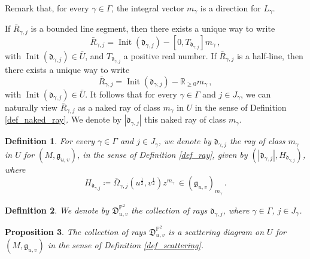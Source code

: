 \documentclass[12pt, a4paper]{amsart}
\newtheorem{defn}{Definition}[section]
\newtheorem{prop}[defn]{Proposition}
\newcommand\PP{\mathbb P}
\newcommand\R{\mathbb R}
\newcommand\fd{\mathfrak d}
\newcommand\fD{\mathfrak D}
\newcommand\fg{\mathfrak g}
\newcommand\Init{\operatorname{Init}}
\begin{document}
Remark that, for every $\gamma \in \Gamma$, 
the integral vector $m_\gamma$ is a direction for $L_\gamma$.

If $\bar{R}_{\gamma,j}$ is a bounded line segment, then there
exists a unique way to write 
\[\bar{R}_{\gamma,j}=\Init(\fd_{\gamma,j}) - [0,T_{\fd_{\gamma,j}}] m_\gamma \,,\]
with
$\Init(\fd_{\gamma,j}) \in \bar{U}$, and
$T_{\fd_{\gamma,j}}$ a positive real number.
If $\bar{R}_{\gamma,j}$ is a half-line, then there exists a unique way to write
\[\bar{R}_{\gamma,j}=\Init(\fd_{\gamma,j}) - \R_{\geqslant 0} m_\gamma \,,\]
with  $\Init(\fd_{\gamma,j}) \in \bar{U}$.
It follows that for every $\gamma \in \Gamma$ and $j \in J_\gamma$, we can naturally view 
$\bar{R}_{\gamma,j}$ as a naked ray of class $m_\gamma$ in $U$ in the sense of Definition 
\ref{def_naked_ray}. We denote by $|\fd_{\gamma,j}|$ this naked ray of class $m_\gamma$.


\begin{defn} \label{def_ray_stability_scattering}
For every $\gamma \in \Gamma$
and $j \in J_\gamma$, we denote by $\fd_{\gamma,j}$ the ray of class 
$m_\gamma$ in $U$ for 
$(M, \fg_{u,v})$, in the sense of Definition \ref{def_ray}, given by 
$(|\fd_{\gamma,j}|, H_{\fd_{\gamma,j}})$,
where 
\[H_{\fd_{\gamma,j}}\coloneq
\overline{\Omega}_{\gamma,j}(u^{\frac{1}{2}},v^{\frac{1}{2}})
z^{m_\gamma} \,\in (\fg_{u,v})_{m_\gamma}\,.\]
\end{defn}

\begin{defn}\label{defn_scattering_stability}
We denote by $\fD^{\PP^2}_{u,v}$ the collection of rays 
$\fd_{\gamma,j}$, where $\gamma \in \Gamma$, 
$j \in J_\gamma$.
\end{defn}


\begin{prop}
The collection of rays $\fD^{\PP^2}_{u,v}$ is a scattering diagram on 
$U$ for $(M,\fg_{u,v})$ in the sense of Definition \ref{def_scattering}.
\end{prop}
\end{document}
